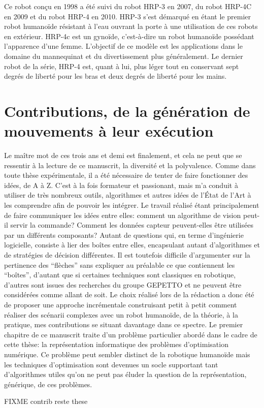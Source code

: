 Ce robot conçu en 1998 a été suivi du robot HRP-3 en 2007, du robot
HRP-4C en 2009 et du robot HRP-4 en 2010. HRP-3 s'est démarqué en
étant le premier robot humanoïde résistant à l'eau ouvrant la porte à
une utilisation de ces robots en extérieur. HRP-4c est un gynoïde,
c'est-à-dire un robot humanoïde possédant l'apparence d'une
femme. L'objectif de ce modèle est les applications dans le domaine du
mannequinat et du divertissement plus généralement. Le dernier robot
de la série, HRP-4 est, quant à lui, plus léger tout en conservant
sept degrés de liberté pour les bras et deux degrés de liberté pour
les mains.


\section{Contributions, de la génération de mouvements à leur exécution}


Le maître mot de ces trois ans et demi est finalement, et cela ne peut
que se ressentir à la lecture de ce manuscrit, la diversité et la
polyvalence. Comme dans toute thèse expérimentale, il a été nécessaire
de tenter de faire fonctionner des idées, de A à Z. C'est à la fois
formateur et passionant, mais m'a conduit à utiliser de très nombreux
outils, algorithmes et autres idées de l'État de l'Art à les
comprendre afin de pouvoir les intégrer. Le travail réalisé étant
principalement de faire communiquer les idées entre elles: comment un
algorithme de vision peut-il servir la commande? Comment les données
capteur peuvent-elles être utilisées par un différents composants?
Autant de questions qui, en terme d'ingénierie logicielle, consiste à
lier des boîtes entre elles, encapsulant autant d'algorithmes et de
stratégies de décision différentes. Il est toutefois difficile
d'argumenter sur la pertinence des ``flèches'' sans expliquer au
préalable ce que contiennent les ``boîtes'', d'autant que si certaines
techniques sont classiques en robotique, d'autres sont issues des
recherches du groupe GEPETTO et ne peuvent être considérées comme
allant de soit. Le choix réalisé lors de la rédaction a donc été de
proposer une approche incrémentale construisant petit à petit comment
réaliser des scénarii complexes avec un robot humanoïde, de la
théorie, à la pratique, mes contributions se situant davantage dans ce
spectre. Le premier chapitre de ce manuscrit traite d'un problème
particulier abordé dans le cadre de cette thèse: la représentation
informatique des problèmes d'optimisation numérique. Ce problème peut
sembler distinct de la robotique humanoïde mais les techniques
d'optimisation sont devenues un socle supportant tant d'algorithmes
utiles qu'on ne peut pas éluder la question de la représentation,
générique, de ces problèmes.


FIXME contrib reste these
